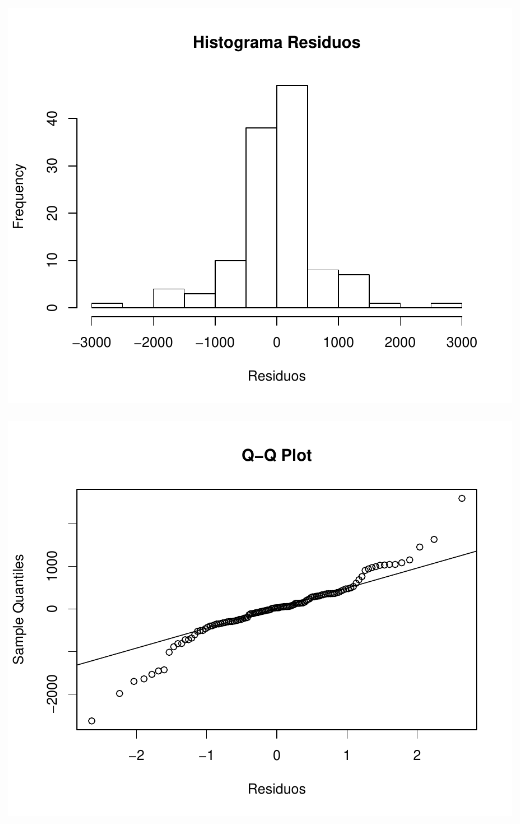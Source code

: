 \documentclass[11pt,a4paper,oneside]{article}\usepackage[]{graphicx}\usepackage[]{color}
\makeatletter
\def\maxwidth{ %
  \ifdim\Gin@nat@width>\linewidth
    \linewidth
  \else
    \Gin@nat@width
  \fi
}
\newenvironment{knitrout}{}{} %
\makeatother
\begin{document}
\begin{knitrout}
{\centering \includegraphics[width=\maxwidth]{figure/unnamed-chunk-16-35} 

}




{\centering \includegraphics[width=\maxwidth]{figure/unnamed-chunk-16-36} 

}





\end{knitrout}
\end{document}
